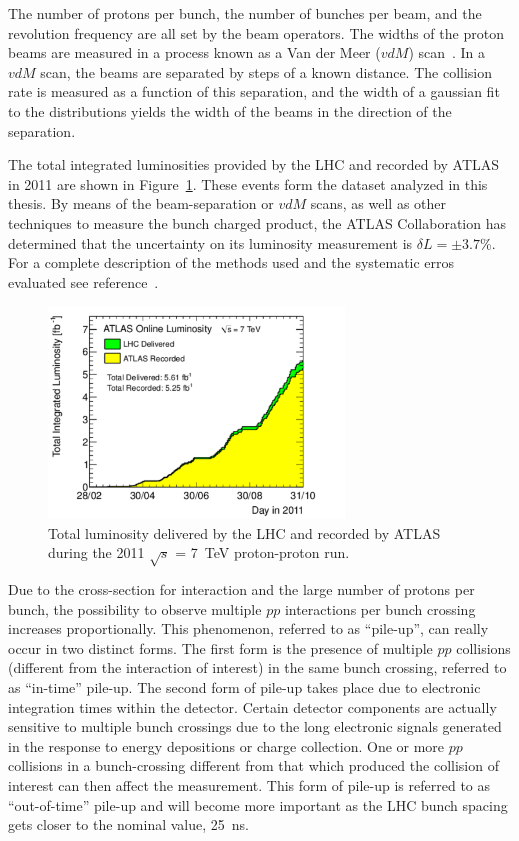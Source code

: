 The number of protons per bunch, the number of bunches per beam, and the revolution frequency are all set by the beam operators. The widths of the proton beams are measured in a process known as a Van der Meer ($vdM$) scan~\cite{vanderMeer:296752}. In a $vdM$ scan, the beams are separated by steps of a known distance. The collision rate is measured as a function of this separation, and the width of a gaussian fit to the distributions yields the width of the beams in the direction of the separation.  

The total integrated luminosities provided by the LHC and recorded by ATLAS in 2011 are shown in Figure~\ref{fig:integratedlumi}. These events form the dataset analyzed in this thesis. By means of the beam-separation or $vdM$ scans, as well as other techniques to measure the bunch charged product, the ATLAS Collaboration has determined that the uncertainty on its luminosity measurement is $\delta L = \pm 3.7$\%. For a complete description of the methods used and the systematic erros evaluated see reference~\cite{ATLAS-CONF-2011-116}.

\begin{figure}[htbp]
  \begin{center}
      \includegraphics[width=0.7\textwidth]{Fig2/sumLumiByDay.pdf}
    \caption{Total luminosity delivered by the LHC and recorded by ATLAS during the 2011 $\sqrt{s}$ = 7~TeV proton-proton run.}
    \label{fig:integratedlumi}
  \end{center}
\end{figure}


Due to the cross-section for interaction and the large number of protons per bunch, the possibility to observe multiple $pp$ interactions per bunch crossing increases proportionally. This phenomenon, referred to as ``pile-up'', can really occur in two distinct forms. The first form is the presence of multiple $pp$ collisions (different from the interaction of interest) in the same bunch crossing, referred to as ``in-time'' pile-up. The second form of pile-up takes place due to electronic integration times within the detector. Certain detector components are actually sensitive to multiple bunch crossings due to the long electronic signals generated in the response to energy depositions or charge collection. One or more $pp$ collisions in a bunch-crossing different from that which produced the collision of interest can then affect the measurement. This form of pile-up is referred to as ``out-of-time'' pile-up and will become more important as the LHC bunch spacing gets closer to the nominal value, 25~ns.

